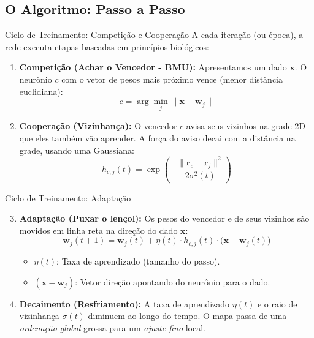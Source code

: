 \documentclass[aspectratio=169]{beamer}
\begin{document}
	\subsection{O Algoritmo: Passo a Passo}
	\begin{frame}{Ciclo de Treinamento: Competição e Cooperação}
		A cada iteração (ou época), a rede executa etapas baseadas em princípios biológicos:
		
		\begin{enumerate}
			\item \textbf{Competição (Achar o Vencedor - BMU):}
			Apresentamos um dado $\mathbf{x}$. O neurônio $c$ com o vetor de pesos mais próximo vence (menor distância euclidiana):
			\[
			c = \arg\min_j \|\mathbf{x} - \mathbf{w}_j\|
			\]
			
			\item \textbf{Cooperação (Vizinhança):}
			O vencedor $c$ avisa seus vizinhos na grade 2D que eles também vão aprender. A força do aviso decai com a distância na grade, usando uma Gaussiana:
			\[
			h_{c, j}(t) = \exp\left( -\frac{\|\mathbf{r}_c - \mathbf{r}_j\|^2}{2\sigma^2(t)} \right)
			\]
		\end{enumerate}
	\end{frame}
	
	\begin{frame}{Ciclo de Treinamento: Adaptação}
		\begin{enumerate}
			\setcounter{enumi}{2}
			\item \textbf{Adaptação (Puxar o lençol):}
			Os pesos do vencedor e de seus vizinhos são movidos em linha reta na direção do dado $\mathbf{x}$:
			\[
			\mathbf{w}_j(t+1) = \mathbf{w}_j(t) + \eta(t) \cdot h_{c, j}(t) \cdot \big(\mathbf{x} - \mathbf{w}_j(t)\big)
			\]
			\begin{itemize}
				\item $\eta(t)$: Taxa de aprendizado (tamanho do passo).
				\item $(\mathbf{x} - \mathbf{w}_j)$: Vetor direção apontando do neurônio para o dado.
			\end{itemize}
			
			\vspace{0.3cm}
			\item \textbf{Decaimento (Resfriamento):}
			A taxa de aprendizado $\eta(t)$ e o raio de vizinhança $\sigma(t)$ diminuem ao longo do tempo. O mapa passa de uma \textit{ordenação global} grossa para um \textit{ajuste fino} local.
		\end{enumerate}
	\end{frame}
	
\end{document}
